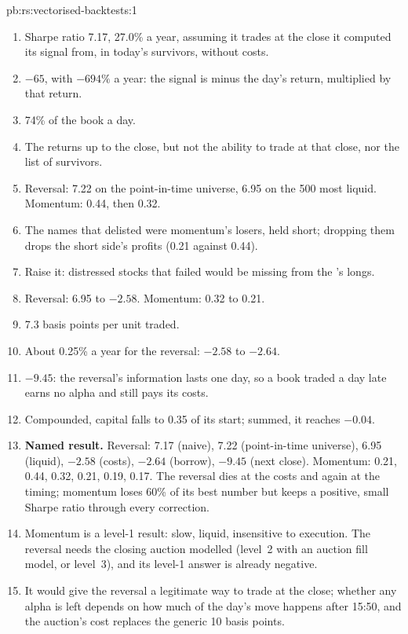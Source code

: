 \begin{solution}{pb:rs:vectorised-backtests:1}
\begin{enumerate}
\item Sharpe ratio 7.17, 27.0\% a year, assuming it trades at the close it computed its signal from, in today's survivors, without costs.
\item $-65$, with $-694\%$ a year: the signal is minus the day's return, multiplied by that return.
\item 74\% of the book a day.
\item The returns up to the close, but not the ability to trade at that close, nor the list of survivors.
\item Reversal: 7.22 on the point-in-time universe, 6.95 on the 500 most liquid. Momentum: 0.44, then 0.32.
\item The names that delisted were momentum's losers, held short; dropping them drops the short side's profits (0.21 against 0.44).
\item Raise it: distressed stocks that failed would be missing from the 's longs.
\item Reversal: 6.95 to $-2.58$. Momentum: 0.32 to 0.21.
\item 7.3 basis points per unit traded.
\item About 0.25\% a year for the reversal: $-2.58$ to $-2.64$.
\item $-9.45$: the reversal's information lasts one day, so a book traded a day late earns no alpha and still pays its costs.
\item Compounded, capital falls to 0.35 of its start; summed, it reaches $-0.04$.
\item \textbf{Named result.} Reversal: 7.17 (naive), 7.22 (point-in-time universe), 6.95 (liquid), $-2.58$ (costs), $-2.64$ (borrow), $-9.45$ (next close).
Momentum: 0.21, 0.44, 0.32, 0.21, 0.19, 0.17. The reversal dies at the costs and again at the timing; momentum loses 60\% of its best number but keeps a
positive, small Sharpe ratio through every correction.
\item Momentum is a level-1 result: slow, liquid, insensitive to execution. The reversal needs the closing auction modelled (level~2 with an auction fill
model, or level~3), and its level-1 answer is already negative.
\item It would give the reversal a legitimate way to trade at the close; whether any alpha is left depends on how much of the day's move happens after
15:50, and the auction's cost replaces the generic 10 basis points.

\end{enumerate}
\end{solution}
